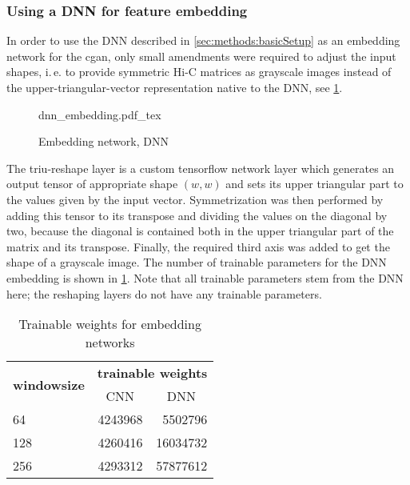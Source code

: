 \subsubsection{Using a DNN for feature embedding} \label{sec:methods:dnn-embedding}
In order to use the DNN described in \cref{sec:methods:basicSetup} as an embedding network
for the \acrshort{cgan}, only small amendments were required to adjust the input shapes,
i.\,e. to provide symmetric Hi-C matrices as grayscale images instead of the upper-triangular-vector representation
native to the DNN, see \cref{fig:methods:dnn-embedding}.
\begin{figure}[p]
    \scriptsize
    \centering
    {dnn_embedding.pdf_tex}
    \caption{Embedding network, DNN} \label{fig:methods:dnn-embedding}
\end{figure}
The triu-reshape layer is a custom tensorflow network layer which generates an output tensor
of appropriate shape $(w,w)$ and sets its upper triangular part to the values given by the input vector.
Symmetrization was then performed by adding this tensor to its transpose and dividing the values on the diagonal by two,
because the diagonal is contained both in the upper triangular part of the matrix and its transpose.
Finally, the required third axis was added to get the shape of a grayscale image.
The number of trainable parameters for the DNN embedding is shown in \cref{tab:methods:embedding_network_params}.
Note that all trainable parameters stem from the DNN here; the reshaping layers do not have any trainable parameters.
\begin{table}[htbp]
\centering
\begin{tabular}{lrr}
\hline
\multicolumn{1}{c}{\multirow{2}{*}{\textbf{windowsize}}} & \multicolumn{2}{c}{\textbf{trainable weights}}    \\
\multicolumn{1}{c}{}                                     & \multicolumn{1}{c}{CNN} & \multicolumn{1}{c}{DNN} \\ \hline
64                                                       & 4243968                 & 5502796                 \\
128                                                      & 4260416                 & 16034732                \\
256                                                      & 4293312                 & 57877612                \\ \hline
\end{tabular}
\caption{Trainable weights for embedding networks}\label{tab:methods:embedding_network_params}
\end{table}

